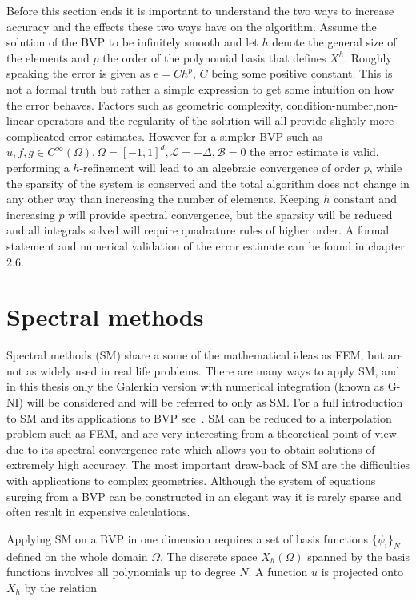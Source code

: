 Before this section ends it is important to understand the two ways to increase accuracy and the effects these two ways have on the algorithm. 
Assume the solution of the BVP to be infinitely smooth and let $h$ denote the general size of the elements
and $p$ the order of the polynomial basis that defines $X^h$. Roughly speaking the error is given as $e = Ch^p$, $C$ being some positive constant.
This is not a formal truth but rather a simple expression to get some intuition on how the error behaves. 
Factors such as geometric complexity, condition-number,non-linear operators and the regularity of the 
solution will all provide slightly more complicated error estimates. 
However for a simpler BVP such as $u,f,g \in C^{\infty}(\Omega), \Omega = [-1,1]^d, \mathcal{L} = -\Delta,\mathcal{B} = 0$ the error estimate is valid.  
performing a $h$-refinement will lead to an algebraic convergence of order $p$, while the sparsity of the system is conserved
and the total algorithm does not change in any other way than increasing the number of elements.
Keeping $h$ constant and increasing $p$ will provide spectral convergence, but the sparsity will be reduced and all integrals solved will require 
quadrature rules of higher order. A formal statement and numerical validation of the error estimate can be found in \cite{Karniadakis} chapter 2.6.  

\section{Spectral methods}
Spectral methods (SM) share a some of the mathematical ideas as FEM, but are not as widely used in real life problems. 
There are many ways to apply SM, 
and in this thesis only the Galerkin version with numerical integration (known as G-NI) will be considered and will be referred to only as SM. 
For a full introduction to SM and its applications to BVP see~\cite{Canuto}.
SM can be reduced to a interpolation problem such as FEM, and are very interesting from a theoretical point of view due to its 
spectral convergence rate which allows you to obtain solutions of extremely high accuracy. 
The most important draw-back of SM are the difficulties with applications to complex geometries. Although the system of equations surging from
a BVP can be constructed in an elegant way it is rarely sparse and often result in expensive calculations. 

Applying SM on a BVP in one dimension requires a set of basis functions $\{\psi_i\}_N$ defined on the whole domain $\Omega$. 
The discrete space $X_h(\Omega)$ spanned by the basis functions involves all polynomials up to degree $N$.
A function $u$ is projected onto $X_h$ by the relation

